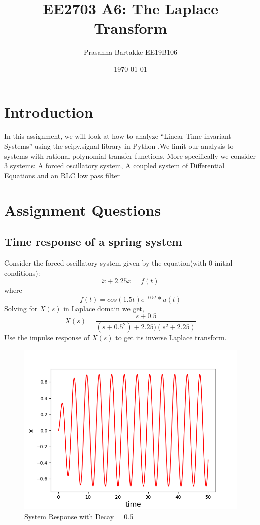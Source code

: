 \documentclass{article}
\title{EE2703 A6: The Laplace Transform}
\author{Prasanna Bartakke EE19B106}
\date{\today} %
\begin{document}
\maketitle

\section{Introduction}
In this assignment, we will look at how to analyze “Linear Time-invariant Systems” using the scipy.signal library in Python .We limit our analysis to systems with rational polynomial transfer functions. More specifically we consider 3 systems: A forced oscillatory system, A coupled system of Differential Equations and an RLC low pass filter  

\section{Assignment Questions}
\subsection{Time response of a spring system}
Consider the forced oscillatory system given by the equation(with 0 initial conditions):
\begin{equation}
    \ddot x + 2.25x = f(t)
\end{equation}
where
\begin{equation}
    f(t) = cos(1.5t)e^{-0.5t}*u(t)
\end{equation}
Solving for $X(s)$ in Laplace domain we get,
\begin{equation}
    X(s) = \frac{s+0.5}{(s+0.5^2)+2.25)(s^2+2.25)}
\end{equation}
Use the impulse response of $X(s)$ to get its inverse Laplace transform.

\begin{figure}[h!]
\centering
\includegraphics[scale=0.6]{fig0.png}
\caption{System Response with Decay = 0.5}
\label{fig:System Response with Decay = 0.5}
\end{figure}
\end{document}
